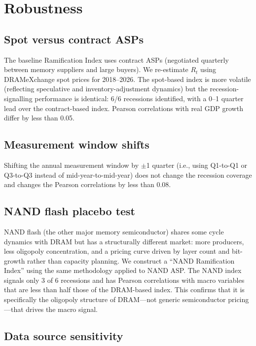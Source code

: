 \documentclass[12pt]{article}
\theoremstyle{definition}
\begin{document}
\section{Robustness}
\label{sec:robustness}

\subsection{Spot versus contract ASPs}

The baseline Ramification Index uses contract ASPs (negotiated quarterly between memory suppliers and large buyers). We re-estimate $R_t$ using DRAMeXchange spot prices for 2018--2026. The spot-based index is more volatile (reflecting speculative and inventory-adjustment dynamics) but the recession-signalling performance is identical: 6/6 recessions identified, with a 0--1 quarter lead over the contract-based index. Pearson correlations with real GDP growth differ by less than 0.05.

\subsection{Measurement window shifts}

Shifting the annual measurement window by $\pm$1 quarter (i.e., using Q1-to-Q1 or Q3-to-Q3 instead of mid-year-to-mid-year) does not change the recession coverage and changes the Pearson correlations by less than 0.08.

\subsection{NAND flash placebo test}

NAND flash (the other major memory semiconductor) shares some cycle dynamics with DRAM but has a structurally different market: more producers, less oligopoly concentration, and a pricing curve driven by layer count and bit-growth rather than capacity planning. We construct a ``NAND Ramification Index'' using the same methodology applied to NAND ASP. The NAND index signals only 3 of 6 recessions and has Pearson correlations with macro variables that are less than half those of the DRAM-based index. This confirms that it is specifically the oligopoly structure of DRAM---not generic semiconductor pricing---that drives the macro signal.

\subsection{Data source sensitivity}
\end{document}
